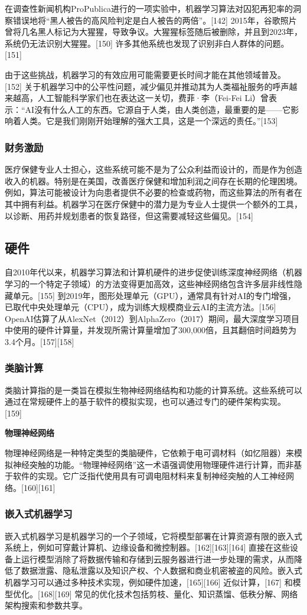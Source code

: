 在调查性新闻机构ProPublica进行的一项实验中，机器学习算法对囚犯再犯率的洞察错误地将“黑人被告的高风险判定是白人被告的两倍”。[142] 2015年，谷歌照片曾将几名黑人标记为大猩猩，导致争议。大猩猩标签随后被删除，并且到2023年，系统仍无法识别大猩猩。[150] 许多其他系统也发现了识别非白人群体的问题。[151]  

由于这些挑战，机器学习的有效应用可能需要更长时间才能在其他领域普及。[152] 关于机器学习中的公平性问题，减少偏见并推动其为人类福祉服务的呼声越来越高，人工智能科学家们也在表达这一关切，费菲·李（Fei-Fei Li）曾表示：“AI没有什么人工的东西。它源自于人类，由人类创造，最重要的是——它影响着人类。它是我们刚刚开始理解的强大工具，这是一个深远的责任。”[153]
\subsubsection{财务激励}  
医疗保健专业人士担心，这些系统可能不是为了公众利益而设计的，而是作为创造收入的机器。特别是在美国，改善医疗保健和增加利润之间存在长期的伦理困境。例如，算法可能被设计为向患者提供不必要的检查或药物，而这些算法的所有者在其中拥有利益。机器学习在医疗保健中的潜力是为专业人士提供一个额外的工具，以诊断、用药并规划患者的恢复路径，但这需要减轻这些偏见。[154]
\subsection{硬件}  
自2010年代以来，机器学习算法和计算机硬件的进步促使训练深度神经网络（机器学习的一个特定子领域）的方法变得更加高效，这些神经网络包含许多层非线性隐藏单元。[155] 到2019年，图形处理单元（GPU），通常具有针对AI的专门增强，已取代中央处理单元（CPU），成为训练大规模商业云AI的主流方法。[156] OpenAI估算了从AlexNet（2012）到AlphaZero（2017）期间，最大深度学习项目中使用的硬件计算量，并发现所需计算量增加了300,000倍，且其翻倍时间趋势为3.4个月。[157][158]
\subsubsection{类脑计算}  
类脑计算指的是一类旨在模拟生物神经网络结构和功能的计算系统。这些系统可以通过在常规硬件上的基于软件的模拟实现，也可以通过专门的硬件架构实现。[159]

\textbf{物理神经网络}  

物理神经网络是一种特定类型的类脑硬件，它依赖于电可调材料（如忆阻器）来模拟神经突触的功能。“物理神经网络”这一术语强调使用物理硬件进行计算，而非基于软件的实现。它广泛指代使用具有可调电阻材料来复制神经突触的人工神经网络。[160][161]
\subsubsection{嵌入式机器学习}  
嵌入式机器学习是机器学习的一个子领域，它将模型部署在计算资源有限的嵌入式系统上，例如可穿戴计算机、边缘设备和微控制器。[162][163][164] 直接在这些设备上运行模型消除了将数据传输和存储到云服务器进行进一步处理的需求，从而降低了数据泄露、隐私泄露以及知识产权、个人数据和商业机密被盗的风险。嵌入式机器学习可以通过多种技术实现，例如硬件加速，[165][166] 近似计算，[167] 和模型优化。[168][169] 常见的优化技术包括剪枝、量化、知识蒸馏、低秩分解、网络架构搜索和参数共享。
